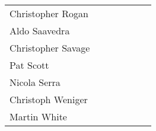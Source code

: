 \begin{center}
\begin{tabular*}{0.99\textwidth}{@{\extracolsep{\fill}}|lcccccc|}
  Christopher Rogan     &   &\M &    & \M &    &    \\
  Aldo Saavedra         & \M&\M &    & \M &    &    \\
  Christopher Savage    &   &   & \M &    & \C &    \\
  Pat Scott             & \C&\M & \M & \M & \M &    \\
  Nicola Serra          &   &   &    & \M &    & \M \\
  Christoph Weniger     & \M&\M & \M &    & \C &    \\
  Martin White          &   &\M &    & \C &    &    \\
  \hline
\end{tabular*}
\end{center}


